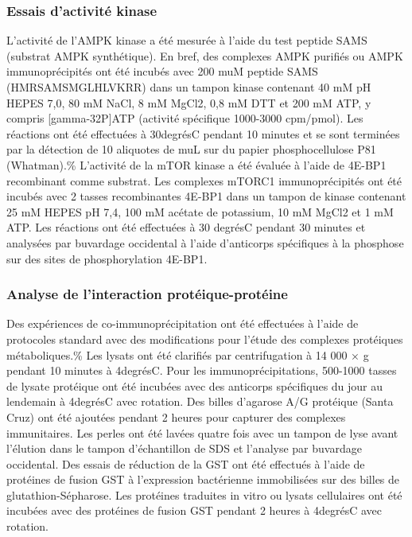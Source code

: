 \documentclass[11pt,a4paper]{article}
\begin{document}
\subsubsection{Essais d'activité kinase}

L'activité de l'AMPK kinase a été mesurée à l'aide du test peptide SAMS (substrat AMPK synthétique). En bref, des complexes AMPK purifiés ou AMPK immunoprécipités ont été incubés avec 200 muM peptide SAMS (HMRSAMSMGLHLVKRR) dans un tampon kinase contenant 40 mM pH HEPES 7,0, 80 mM NaCl, 8 mM MgCl2, 0,8 mM DTT et 200 mM ATP, y compris [gamma-32P]ATP (activité spécifique 1000-3000 cpm/pmol). Les réactions ont été effectuées à 30degrésC pendant 10 minutes et se sont terminées par la détection de 10 aliquotes de muL sur du papier phosphocellulose P81 (Whatman).\% L'activité de la mTOR kinase a été évaluée à l'aide de 4E-BP1 recombinant comme substrat. Les complexes mTORC1 immunoprécipités ont été incubés avec 2 tasses recombinantes 4E-BP1 dans un tampon de kinase contenant 25 mM HEPES pH 7,4, 100 mM acétate de potassium, 10 mM MgCl2 et 1 mM ATP. Les réactions ont été effectuées à 30 degrésC pendant 30 minutes et analysées par buvardage occidental à l'aide d'anticorps spécifiques à la phosphose sur des sites de phosphorylation 4E-BP1.

\subsubsection{Analyse de l'interaction protéique-protéine}

Des expériences de co-immunoprécipitation ont été effectuées à l'aide de protocoles standard avec des modifications pour l'étude des complexes protéiques métaboliques.\% Les lysats ont été clarifiés par centrifugation à 14 000 × g pendant 10 minutes à 4degrésC. Pour les immunoprécipitations, 500-1000 tasses de lysate protéique ont été incubées avec des anticorps spécifiques du jour au lendemain à 4degrésC avec rotation. Des billes d'agarose A/G protéique (Santa Cruz) ont été ajoutées pendant 2 heures pour capturer des complexes immunitaires. Les perles ont été lavées quatre fois avec un tampon de lyse avant l'élution dans le tampon d'échantillon de SDS et l'analyse par buvardage occidental. Des essais de réduction de la GST ont été effectués à l'aide de protéines de fusion GST à l'expression bactérienne immobilisées sur des billes de glutathion-Sépharose. Les protéines traduites in vitro ou lysats cellulaires ont été incubées avec des protéines de fusion GST pendant 2 heures à 4degrésC avec rotation.
\end{document}

